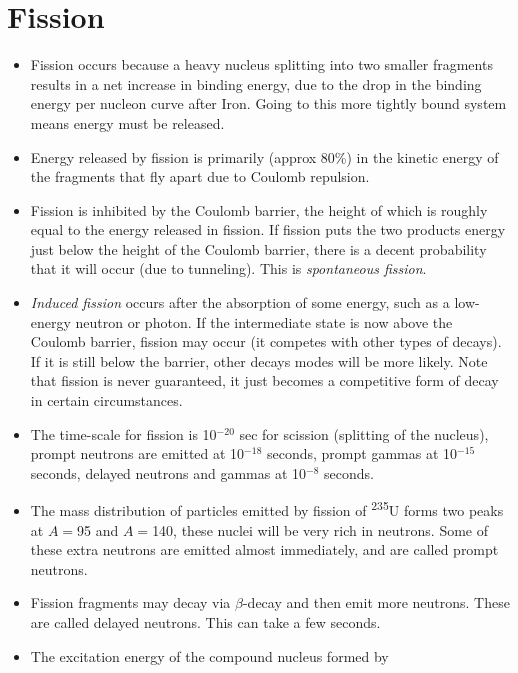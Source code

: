 \documentclass[letter]{article}
\begin{document}
\section{Fission}
\begin{itemize}
\item Fission occurs because a heavy nucleus splitting into two
  smaller fragments results in a net increase in binding energy, due
  to the drop in the binding energy per nucleon curve after
  Iron. Going to this more tightly bound system means energy must be
  released.~\cite[pp. 479]{krane}
\item Energy released by fission is primarily (approx 80\%) in the
  kinetic energy of the fragments that fly apart due to Coulomb
  repulsion.~\cite[pp.479]{krane}
\item Fission is inhibited by the Coulomb barrier, the height of which
  is roughly equal to the energy released in fission. If fission puts
  the two products energy just below the height of the Coulomb
  barrier, there is a decent probability that it will occur (due to
  tunneling). This is \textit{spontaneous
    fission}.~\cite[pp. 481]{krane}
\item \textit{Induced fission} occurs after the absorption of some
  energy, such as a low-energy neutron or photon. If the intermediate
  state is now above the Coulomb barrier, fission may occur (it
  competes with other types of decays). If it is
  still below the barrier, other decays modes will be more
  likely. Note that fission is never guaranteed, it just becomes a
  competitive form of decay in certain
  circumstances.~\cite[pp. 481]{krane}
\item The time-scale for fission is 10$^{-20}$ sec for scission
  (splitting of the nucleus), prompt neutrons are emitted at
  10$^{-18}$ seconds, prompt gammas at 10$^{-15}$ seconds, delayed
  neutrons and gammas at 10$^{-8}$ seconds.~\cite[Walid's Lecture]{lecture}
\item The mass distribution of particles emitted by fission of
  \textsuperscript{235}U forms two
  peaks at $A = $95 and $A = $140, these nuclei will be very rich in
  neutrons. Some of these extra neutrons are emitted almost immediately, and are
  called prompt neutrons.~\cite[pp. 485]{krane}
\item Fission fragments may decay via $\beta$-decay and then emit more
  neutrons. These are called delayed neutrons. This can take a few
  seconds.~\cite[pp. 485]{krane}
\item The excitation energy of the compound nucleus formed by

\end{itemize}
\end{document}
